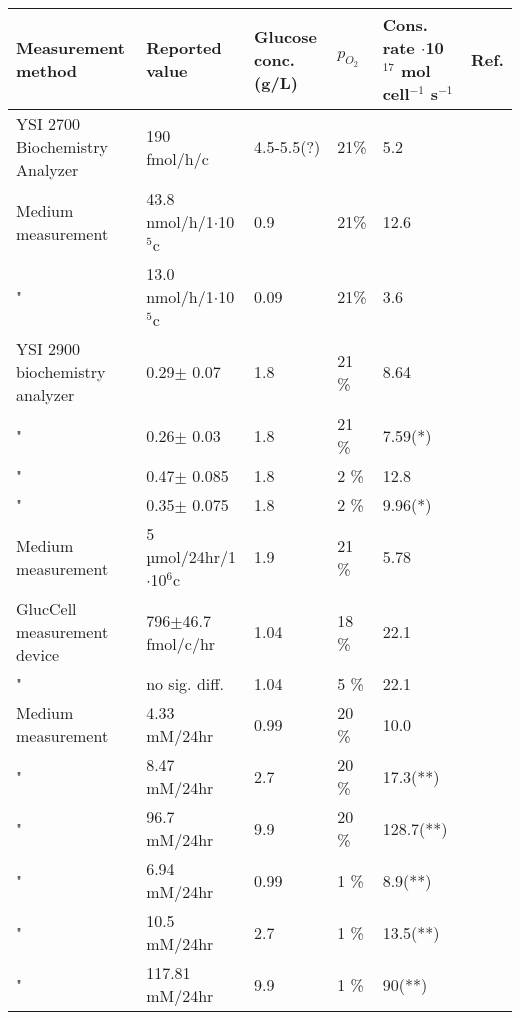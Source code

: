 \documentclass[11pt,a4paper]{article}
\begin{document}
\begin{table}[h!]
\begin{center}
\begin{tabular}{ |p{45mm}|p{35mm}|p{15mm}|p{10mm}|p{15mm}|p{7mm}| }
 \hline

  \textbf{Measurement method} & \textbf{Reported  value} & \textbf{Glucose conc. (g/L)} & $p_{O_2}$ &\textbf{Cons. rate} $\cdot$10$^{17}$ mol cell$^{-1}$ s$^{-1}$  & \textbf{Ref}. \\
 \hline
     YSI 2700 Biochemistry Analyzer  & 190 fmol/h/c & 4.5-5.5(?) & 21\% & 5.2 & \cite{Meadows2008}\\
 \hline
      Medium measurement  & 43.8 nmol/h/1$\cdot$10$^{5}$c & 0.9 & 21\% & 12.6 & \cite{Mazurek1997}\\
 \hline
 "  & 13.0 nmol/h/1$\cdot$10$^{5}$c & 0.09 & 21\% & 3.6 & \cite{Mazurek1997}\\
 \hline
   YSI 2900 biochemistry analyzer  & 0.29$\pm$ 0.07 & 1.8 & 21 \% & 8.64 & \cite{Prado-Garcia2020}\cite{Gardner2022}\\
 \hline
    " & 0.26$\pm$ 0.03 & 1.8 & 21 \% & 7.59(*) & \cite{Prado-Garcia2020}\cite{Gardner2022}\\
 \hline
   "  & 0.47$\pm$ 0.085 & 1.8 & 2 \% & 12.8 & \cite{Prado-Garcia2020}\cite{Gardner2022}\\
 \hline
     " & 0.35$\pm$ 0.075 & 1.8 & 2 \% & 9.96(*) & \cite{Prado-Garcia2020}\cite{Gardner2022}\\
 \hline
      Medium measurement & 5 µmol/24hr/1$\cdot$10$^{6}$c& 1.9 & 21 \% & 5.78 & \cite{Kaplan1990}\cite{Gardner2022}\\
 \hline
       GlucCell measurement device  & 796$\pm$46.7 fmol/c/hr & 1.04 & 18 \% & 22.1  & \cite{Gardner2022}\\
 \hline
        " & no sig. diff.  & 1.04 & 5 \% & 22.1  & \cite{Gardner2022}\\
 \hline
        Medium measurement  & 4.33 mM/24hr & 0.99 & 20 \% & 10.0  & \cite{Bayar2021}\\
 \hline
         "  & 8.47 mM/24hr & 2.7 & 20 \% & 17.3(**)  & \cite{Bayar2021}\\
 \hline
          " & 96.7 mM/24hr & 9.9  & 20 \% & 128.7(**)  & \cite{Bayar2021}\\
 \hline
         "  & 6.94 mM/24hr & 0.99 & 1 \% & 8.9(**)  & \cite{Bayar2021}\\
 \hline
         "  & 10.5 mM/24hr & 2.7 & 1 \% & 13.5(**)  & \cite{Bayar2021}\\
 \hline
          " & 117.81 mM/24hr & 9.9  & 1 \% & 90(**)  & \cite{Bayar2021}\\

\end{tabular}
\end{center}
\end{table}
\end{document}
